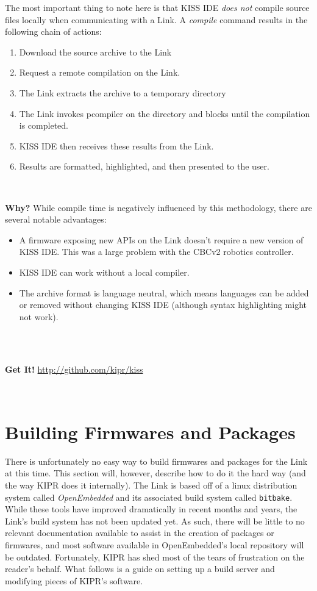 \documentclass[12pt,letterpaper]{article}
\newcommand{\bcolorbox}[4]{\noindent \\ \fcolorbox{#1}{#2} {\parbox{\textwidth}{\vspace{.1em}\textbf{#3} #4\vspace{.1em}}} \\}
\newcommand{\why}[1]{\bcolorbox{black}{GhostWhite}{Why?}{#1}}
\newcommand{\getit}[1]{\bcolorbox{Indigo}{Lavender}{Get It!}{#1}}
\begin{document}
	
	The most important thing to note here is that KISS IDE \emph{does not} compile source files locally when communicating with a Link.
	A \emph{compile} command results in the following chain of actions:
	\begin{enumerate}
		\setlength{\itemsep}{0em}
		\item Download the source archive to the Link
		\item Request a remote compilation on the Link.
		\item The Link extracts the archive to a temporary directory
		\item The Link invokes pcompiler on the directory and blocks until
		the compilation is completed.
		\item KISS IDE then receives these results from the Link.
		\item Results are formatted, highlighted, and then presented to the user.
	\end{enumerate}
	
	\why{While compile time is negatively influenced by this methodology, there are several notable advantages:
	\begin{itemize}
		\setlength{\itemsep}{0em}
		\item A firmware exposing new APIs on the Link doesn't require a new version of KISS IDE. This was a large problem
		with the CBCv2 robotics controller.
		\item KISS IDE can work without a local compiler.
		\item The archive format is language neutral, which means languages can be added or removed without
		changing KISS IDE (although syntax highlighting might not work).
	\end{itemize}}
	
	\getit{\url{http://github.com/kipr/kiss}}
	\section{Building Firmwares and Packages}
	There is unfortunately no easy way to build firmwares and packages for the Link at this time. This section will, however, describe how
	to do it the hard way (and the way KIPR does it internally). The Link is based off of a linux distribution system called \emph{OpenEmbedded}
	and its associated build system called \texttt{bitbake}. While these tools have improved dramatically in recent months and years, the Link's
	build system has not been updated yet. As such, there will be little to no relevant documentation available to assist in the creation
	of packages or firmwares, and most software available in OpenEmbedded's local repository will be outdated. Fortunately, KIPR has shed most of
	the tears of frustration on the reader's behalf. What follows is a guide on setting up a build server and modifying pieces of KIPR's software.
	
\end{document}
